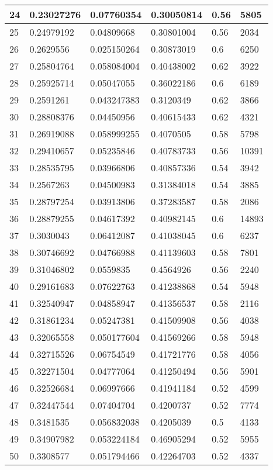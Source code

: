 \begin{longtable}{|l|l|l|l|l|l|}
24 & 0.23027276 & 0.07760354 & 0.30050814 & 0.56 & 5805 \\ \hline 
25 & 0.24979192 & 0.04809668 & 0.30801004 & 0.56 & 2034 \\ \hline 
26 & 0.2629556 & 0.025150264 & 0.30873019 & 0.6 & 6250 \\ \hline 
27 & 0.25804764 & 0.058084004 & 0.40438002 & 0.62 & 3922 \\ \hline 
28 & 0.25925714 & 0.05047055 & 0.36022186 & 0.6 & 6189 \\ \hline 
29 & 0.2591261 & 0.043247383 & 0.3120349 & 0.62 & 3866 \\ \hline 
30 & 0.28808376 & 0.04450956 & 0.40615433 & 0.62 & 4321 \\ \hline 
31 & 0.26919088 & 0.058999255 & 0.4070505 & 0.58 & 5798 \\ \hline 
32 & 0.29410657 & 0.05235846 & 0.40783733 & 0.56 & 10391 \\ \hline 
33 & 0.28535795 & 0.03966806 & 0.40857336 & 0.54 & 3942 \\ \hline 
34 & 0.2567263 & 0.04500983 & 0.31384018 & 0.54 & 3885 \\ \hline 
35 & 0.28797254 & 0.03913806 & 0.37283587 & 0.58 & 2086 \\ \hline 
36 & 0.28879255 & 0.04617392 & 0.40982145 & 0.6 & 14893 \\ \hline 
37 & 0.3030043 & 0.06412087 & 0.41038045 & 0.6 & 6237 \\ \hline 
38 & 0.30746692 & 0.04766988 & 0.41139603 & 0.58 & 7801 \\ \hline 
39 & 0.31046802 & 0.0559835 & 0.4564926 & 0.56 & 2240 \\ \hline 
40 & 0.29161683 & 0.07622763 & 0.41238868 & 0.54 & 5948 \\ \hline 
41 & 0.32540947 & 0.04858947 & 0.41356537 & 0.58 & 2116 \\ \hline 
42 & 0.31861234 & 0.05247381 & 0.41509908 & 0.56 & 4038 \\ \hline 
43 & 0.32065558 & 0.050177604 & 0.41569266 & 0.58 & 5948 \\ \hline 
44 & 0.32715526 & 0.06754549 & 0.41721776 & 0.58 & 4056 \\ \hline 
45 & 0.32271504 & 0.04777064 & 0.41250494 & 0.56 & 5901 \\ \hline 
46 & 0.32526684 & 0.06997666 & 0.41941184 & 0.52 & 4599 \\ \hline 
47 & 0.32447544 & 0.07404704 & 0.4200737 & 0.52 & 7774 \\ \hline 
48 & 0.3481535 & 0.056832038 & 0.4205039 & 0.5 & 4133 \\ \hline 
49 & 0.34907982 & 0.053224184 & 0.46905294 & 0.52 & 5955 \\ \hline 
50 & 0.3308577 & 0.051794466 & 0.42264703 & 0.52 & 4337 \\ \hline 
\end{longtable}